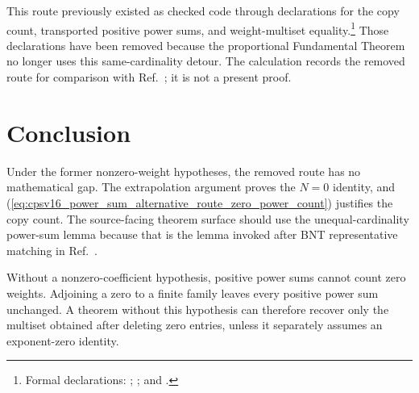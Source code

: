 \documentclass{article}
\begin{document}
This route previously existed as checked \Lean{} code through declarations for
the copy count, transported positive power sums, and weight-multiset
equality.\footnote{Formal declarations:
;
;
and
.}
Those declarations have been removed because the proportional Fundamental
Theorem no longer uses this same-cardinality detour. The calculation records
the removed route for comparison with Ref.~\cite{Cirac2016MPDO_arXiv}; it is
not a present \Lean{} proof.

\section{Conclusion}

Under the former nonzero-weight hypotheses, the removed route has no
mathematical gap. The extrapolation argument proves the $N=0$ identity, and
(\ref{eq:cpsv16_power_sum_alternative_route_zero_power_count}) justifies the
copy count. The source-facing theorem surface should use the
unequal-cardinality power-sum lemma because that is the lemma invoked after
BNT representative matching in Ref.~\cite{Cirac2016MPDO_arXiv}.

Without a nonzero-coefficient hypothesis, positive power sums cannot count
zero weights. Adjoining a zero to a finite family leaves every positive power
sum unchanged. A theorem without this hypothesis can therefore recover only
the multiset obtained after deleting zero entries, unless it separately
assumes an exponent-zero identity.



\end{document}
